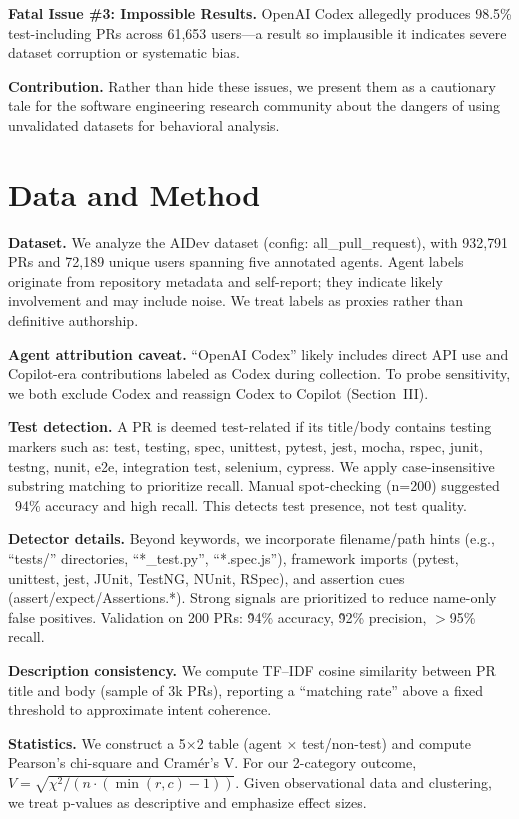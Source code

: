 \documentclass[conference]{IEEEtran}
\begin{document}
\textbf{Fatal Issue \#3: Impossible Results.} OpenAI Codex allegedly produces 98.5\% test-including PRs across 61,653 users—a result so implausible it indicates severe dataset corruption or systematic bias.

\textbf{Contribution.} Rather than hide these issues, we present them as a cautionary tale for the software engineering research community about the dangers of using unvalidated datasets for behavioral analysis.

\section{Data and Method}
\textbf{Dataset.} We analyze the AIDev dataset (config: all\_pull\_request), with 932{,}791 PRs and 72{,}189 unique users spanning five annotated agents. Agent labels originate from repository metadata and self-report; they indicate likely involvement and may include noise. We treat labels as proxies rather than definitive authorship.

\textbf{Agent attribution caveat.} ``OpenAI Codex'' likely includes direct API use and Copilot-era contributions labeled as Codex during collection. To probe sensitivity, we both exclude Codex and reassign Codex to Copilot (Section~III).

\textbf{Test detection.} A PR is deemed test-related if its title/body contains testing markers such as: test, testing, spec, unittest, pytest, jest, mocha, rspec, junit, testng, nunit, e2e, integration test, selenium, cypress. We apply case-insensitive substring matching to prioritize recall. Manual spot-checking (n=200) suggested ~94\% accuracy and high recall. This detects test presence, not test quality.

\textbf{Detector details.} Beyond keywords, we incorporate filename/path hints (e.g., ``tests/'' directories, ``*\_test.py'', ``*.spec.js''), framework imports (pytest, unittest, jest, JUnit, TestNG, NUnit, RSpec), and assertion cues (assert/expect/Assertions.*). Strong signals are prioritized to reduce name-only false positives. Validation on 200 PRs: \~94\% accuracy, \~92\% precision, $>$95\% recall.

\textbf{Description consistency.} We compute TF--IDF cosine similarity between PR title and body (sample of 3k PRs), reporting a ``matching rate'' above a fixed threshold to approximate intent coherence.

  \textbf{Statistics.} We construct a 5×2 table (agent × test/non-test) and compute Pearson's chi-square and Cram\'er's V. For our 2-category outcome, $V = \sqrt{\chi^2/(n\cdot (\min(r,c)-1))}$. Given observational data and clustering, we treat p-values as descriptive and emphasize effect sizes.
\end{document}
